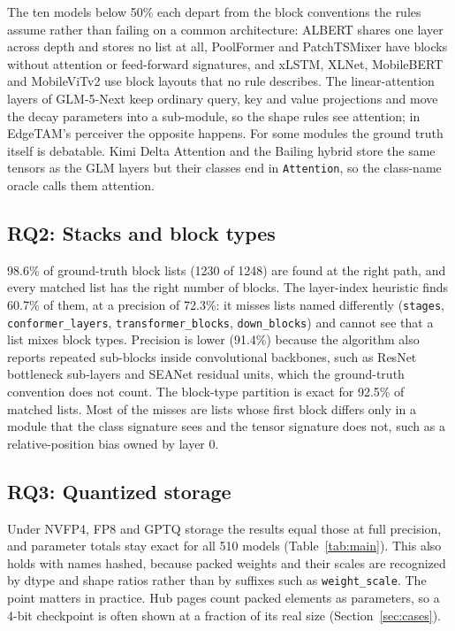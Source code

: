 \documentclass[11pt]{article}
\newcommand{\tn}[1]{\texttt{#1}}
\begin{document}
The ten models below 50\% each depart from the block conventions the rules assume rather than failing on a common architecture: ALBERT shares one layer across depth and stores no list at all, PoolFormer and PatchTSMixer have blocks without attention or feed-forward signatures, and xLSTM, XLNet, MobileBERT and MobileViTv2 use block layouts that no rule describes. The linear-attention layers of GLM-5-Next keep ordinary query, key and value projections and move the decay parameters into a sub-module, so the shape rules see attention; in EdgeTAM's perceiver the opposite happens. For some modules the ground truth itself is debatable. Kimi Delta Attention and the Bailing hybrid store the same tensors as the GLM layers but their classes end in \tn{Attention}, so the class-name oracle calls them attention.

\subsection{RQ2: Stacks and block types}
98.6\% of ground-truth block lists (1230 of 1248) are found at the right path, and every matched list has the right number of blocks. The layer-index heuristic finds 60.7\% of them, at a precision of 72.3\%: it misses lists named differently (\tn{stages}, \tn{conformer\_layers}, \tn{transformer\_blocks}, \tn{down\_blocks}) and cannot see that a list mixes block types. Precision is lower (91.4\%) because the algorithm also reports repeated sub-blocks inside convolutional backbones, such as ResNet bottleneck sub-layers and SEANet residual units, which the ground-truth convention does not count. The block-type partition is exact for 92.5\% of matched lists. Most of the misses are lists whose first block differs only in a module that the class signature sees and the tensor signature does not, such as a relative-position bias owned by layer 0.

\subsection{RQ3: Quantized storage}
Under NVFP4, FP8 and GPTQ storage the results equal those at full precision, and parameter totals stay exact for all 510 models (Table~\ref{tab:main}). This also holds with names hashed, because packed weights and their scales are recognized by dtype and shape ratios rather than by suffixes such as \tn{weight\_scale}. The point matters in practice. Hub pages count packed elements as parameters, so a 4-bit checkpoint is often shown at a fraction of its real size (Section~\ref{sec:cases}).
\end{document}

